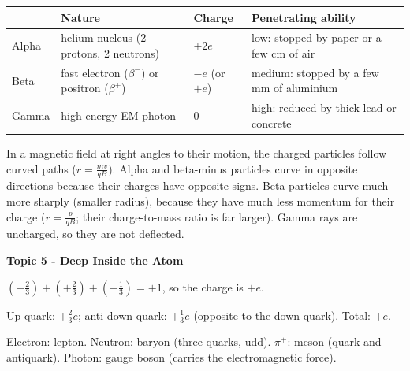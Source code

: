 \documentclass[12pt]{article}
\newcommand\anstopic[1]{\par\Needspace{8\baselineskip}\vspace{4mm}%
  \begin{center}{\headfont\bfseries\fontsize{14}{18}\selectfont #1\par}\end{center}\vspace{2pt}}
\begin{document}
\ansq
\begin{crit}
\end{crit}
\sample
\begin{center}
  \renewcommand\arraystretch{1.4}
  \begin{tabular}{|l|p{36mm}|p{30mm}|p{56mm}|}
    \hline
    & \textbf{Nature} & \textbf{Charge} & \textbf{Penetrating ability}\\ \hline
    Alpha & helium nucleus (2 protons, 2 neutrons) & $+2e$ & low: stopped by paper or a few cm of air\\ \hline
    Beta & fast electron ($\beta^-$) or positron ($\beta^+$) & $-e$ (or $+e$) & medium: stopped by a few mm of
    aluminium\\ \hline
    Gamma & high-energy EM photon & 0 & high: reduced by thick lead or concrete\\ \hline
  \end{tabular}
\end{center}
In a magnetic field at right angles to their motion, the charged particles follow curved paths
($r = \frac{mv}{qB}$). Alpha and beta-minus particles curve in opposite directions because their charges
have opposite signs. Beta particles curve much more sharply (smaller radius), because they have much less
momentum for their charge ($r = \frac{p}{qB}$; their charge-to-mass ratio is far larger). Gamma rays are
uncharged, so they are not deflected.

\anstopic{Topic 5 - Deep Inside the Atom}

\ansq
{}
\begin{crit}
\end{crit}
\sample
$\left(+\frac{2}{3}\right) + \left(+\frac{2}{3}\right) + \left(-\frac{1}{3}\right) = +1$, so the charge is
$+e$.
\begin{crit}
\end{crit}
\sample
Up quark: $+\frac{2}{3}e$; anti-down quark: $+\frac{1}{3}e$ (opposite to the down quark). Total: $+e$.
\begin{crit}
\end{crit}
\sample
Electron: lepton. \quad Neutron: baryon (three quarks, udd). \quad $\pi^+$: meson (quark and antiquark).
\quad Photon: gauge boson (carries the electromagnetic force).
\end{document}
